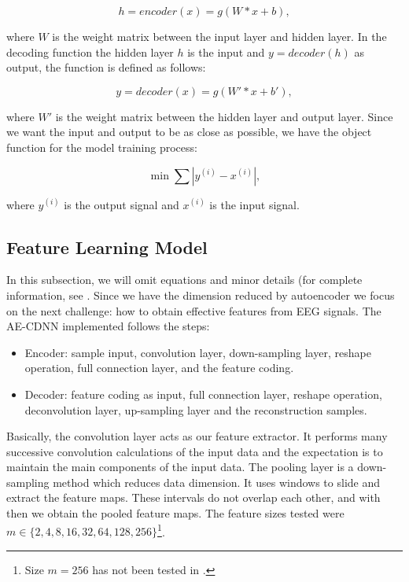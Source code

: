 \begin{equation}
h = encoder(x) = g(W*x+b),
\end{equation}

where $W$ is the weight matrix between the input layer and hidden layer. In the decoding function the hidden layer $h$ is the input and $y = decoder(h)$ as output, the function is defined as follows:

\begin{equation}
y = decoder(x) = g(W'*x + b'),
\end{equation}

where $W'$ is the weight matrix between the hidden layer and output layer. Since we want the input and output to be as close as possible, we have the object function for the model training process:

\begin{equation}
\min \sum |y^{(i)} - x^{(i)}|,
\end{equation}

where $y^{(i)}$ is the output signal and $x^{(i)}$ is the input signal.

\subsection{Feature Learning Model}

In this subsection, we will omit equations and minor details (for complete information, see \cite{Shoeb,emami2019autoencoding}. Since we have the dimension reduced by autoencoder we focus on the next challenge: how to obtain effective features from EEG signals.  The AE-CDNN implemented follows the steps:

\begin{itemize}
\item Encoder: sample input, convolution layer, down-sampling layer, reshape operation, full connection layer, and the feature coding.
\item Decoder: feature coding as input, full 
connection layer, reshape operation, deconvolution layer, up-sampling layer and the reconstruction samples.
\end{itemize}

Basically, the convolution layer acts as our feature extractor. It performs many successive convolution calculations of the input data and the expectation is to maintain the main components of the input data. The pooling layer is a down-sampling method which reduces data dimension. It uses windows to slide and extract the feature maps. These intervals do not overlap each other, and with then we obtain the pooled feature maps. The feature sizes tested were $m \in \{2, 4, 8, 16, 32, 64, 128, 256\}$\footnote{Size $m = 256$ has not been tested in \cite{WenZha:2018}.}.


